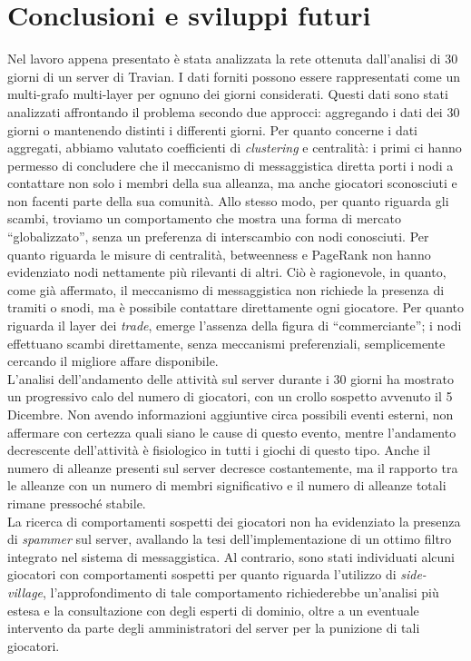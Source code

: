 \chapter{Conclusioni e sviluppi futuri}
Nel lavoro appena presentato è stata analizzata la rete ottenuta dall'analisi di 30 giorni di un server di Travian. I dati forniti possono essere rappresentati come un multi-grafo multi-layer per ognuno dei giorni considerati. Questi dati sono stati analizzati affrontando il problema secondo due approcci: aggregando i dati dei 30 giorni o mantenendo distinti i differenti giorni.
Per quanto concerne i dati aggregati, abbiamo valutato coefficienti di \textit{clustering} e centralità: i primi ci hanno permesso di concludere che il meccanismo di messaggistica diretta porti i nodi a contattare non solo i membri della sua alleanza, ma anche giocatori sconosciuti e non facenti parte della sua comunità. Allo stesso modo, per quanto riguarda gli scambi, troviamo un comportamento che mostra una forma di mercato “globalizzato”, senza un preferenza di interscambio con nodi conosciuti.
Per quanto riguarda le misure di centralità, betweenness e PageRank non hanno evidenziato nodi nettamente più rilevanti di altri. Ciò è ragionevole, in quanto, come già affermato, il meccanismo di messaggistica non richiede la presenza di tramiti o snodi, ma è possibile contattare direttamente ogni giocatore. Per quanto riguarda il layer dei \textit{trade}, emerge l'assenza della figura di “commerciante”; i nodi effettuano scambi direttamente, senza meccanismi preferenziali, semplicemente cercando il migliore affare disponibile.\\
L'analisi dell'andamento delle attività sul server durante i 30 giorni ha mostrato un progressivo calo del numero di giocatori, con un crollo sospetto avvenuto il 5 Dicembre. Non avendo informazioni aggiuntive circa possibili eventi esterni, non affermare con certezza quali siano le cause di questo evento, mentre l'andamento decrescente dell'attività è fisiologico in tutti i giochi di questo tipo.
Anche il numero di alleanze presenti sul server decresce costantemente, ma il rapporto tra le alleanze con un numero di membri significativo e il numero di alleanze totali rimane pressoché stabile.\\
La ricerca di comportamenti sospetti dei giocatori non ha evidenziato la presenza di \textit{spammer} sul server, avallando la tesi dell'implementazione di un ottimo filtro integrato nel sistema di messaggistica. Al contrario, sono stati individuati alcuni giocatori con comportamenti sospetti per quanto riguarda l'utilizzo di \textit{side-village}, l'approfondimento di tale comportamento richiederebbe un'analisi più estesa e la consultazione con degli esperti di dominio, oltre a un eventuale intervento da parte degli amministratori del server per la punizione di tali giocatori.\\
